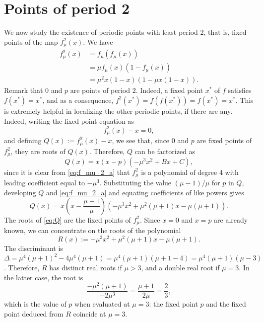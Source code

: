 \documentclass[12pt]{article}
\theoremstyle{plain}
\begin{document}
% 


\section{Points of period 2}
\label{sec:2cycles}
We now study the existence of periodic points with least period 2, that is, fixed points of the map $f_\mu^2(x)$. We have
\begin{align}
f_\mu^2(x) &= f_\mu(f_\mu(x)) \nonumber\\
&= \mu f_\mu(x)(1-f_\mu(x)) \nonumber\\
&= \mu^2 x(1-x)(1-\mu x(1-x)). \label{eq:f_mu_2_a}
\end{align}
Remark that 0 and $p$ are points of period 2. Indeed, a fixed point $x^*$ of $f$ satisfies $f(x^*)=x^*$, and as a consequence, $f^2(x^*)=f(f(x^*))=f(x^*)=x^*$. This is extremely helpful in localizing the other periodic points, if there are any. Indeed, writing the fixed point equation as
\[
f_\mu^2(x)-x=0,
\]
and defining $Q(x):=f_\mu^2(x)-x$, we see that, since $0$ and $p$ are fixed points of $f_\mu^2$, they are roots of $Q(x)$. Therefore, $Q$ can be factorized as
\[
Q(x)=x(x-p)(-\mu^3x^2+Bx+C),
\]
since it is clear from \eqref{eq:f_mu_2_a} that $f_\mu^2$ is a polynomial of degree 4 with leading coefficient equal to $-\mu^3$. Substituting the value $(\mu-1)/\mu$ for $p$ in $Q$, developing $Q$ and \eqref{eq:f_mu_2_a} and equating coefficients of like powers gives
\begin{equation}\label{eq:Q}
Q(x)=x\left(x-\frac{\mu-1}{\mu}\right)\left(-\mu^3 x^2+\mu^2(\mu+1)x-\mu(\mu+1)\right).
\end{equation}
The roots of \eqref{eq:Q} are the fixed points of $f_\mu^2$. Since $x=0$ and $x=p$ are already known, we can concentrate on the roots of the polynomial
\[
R(x):=-\mu^3 x^2+\mu^2(\mu+1)x-\mu(\mu+1).
\]
The discriminant is $\Delta=\mu^4(\mu+1)^2-4\mu^4(\mu+1)=\mu^4(\mu+1)(\mu+1-4)=\mu^4(\mu+1)(\mu-3)$. Therefore, $R$ has distinct real roots if $\mu>3$, and a double real root if $\mu=3$. In the latter case, the root is
\[
\frac{-\mu^2(\mu+1)}{-2\mu^3}=\frac{\mu+1}{2\mu}=\frac 23,
\]
which is the value of $p$ when evaluated at $\mu=3$: the fixed point $p$ and the fixed point deduced from $R$ coincide at $\mu=3$.
\end{document}
